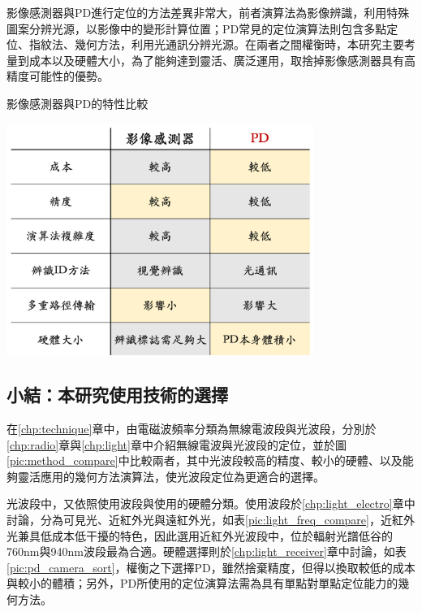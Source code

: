                 影像感測器與PD進行定位的方法差異非常大，前者演算法為影像辨識，利用特殊圖案分辨光源，以影像中的變形計算位置；PD常見的定位演算法則包含多點定位、指紋法、幾何方法，利用光通訊分辨光源。在兩者之間權衡時，本研究主要考量到成本以及硬體大小，為了能夠達到靈活、廣泛運用，取捨掉影像感測器具有高精度可能性的優勢。


                \begin{table}[htpb]
                    \centering
                    \caption{影像感測器與PD的特性比較}
                    \label{pic:pd_camera_sort}
                    \includegraphics[width=10cm]{ch2pic/pd_camera_sort.png}     
                \end{table}

                


        
                

        \subsection{小結：本研究使用技術的選擇}
        

        在\ref{chp:technique}章中，由電磁波頻率分類為無線電波段與光波段，分別於\ref{chp:radio}章與\ref{chp:light}章中介紹無線電波與光波段的定位，並於圖\ref{pic:method_compare}中比較兩者，其中光波段較高的精度、較小的硬體、以及能夠靈活應用的幾何方法演算法，使光波段定位為更適合的選擇。

        光波段中，又依照使用波段與使用的硬體分類。使用波段於\ref{chp:light_electro}章中討論，分為可見光、近紅外光與遠紅外光，如表\ref{pic:light_freq_compare}，近紅外光兼具低成本低干擾的特色，因此選用近紅外光波段中，位於輻射光譜低谷的760nm與940nm波段最為合適。硬體選擇則於\ref{chp:light_receiver}章中討論，如表\ref{pic:pd_camera_sort}，權衡之下選擇PD，雖然捨棄精度，但得以換取較低的成本與較小的體積；另外，PD所使用的定位演算法需為具有單點對單點定位能力的幾何方法。
    
